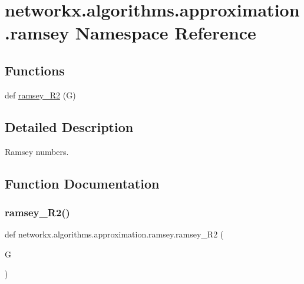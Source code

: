 \hypertarget{namespacenetworkx_1_1algorithms_1_1approximation_1_1ramsey}{}\section{networkx.\+algorithms.\+approximation.\+ramsey Namespace Reference}
\label{namespacenetworkx_1_1algorithms_1_1approximation_1_1ramsey}
\subsection*{Functions}
\begin{DoxyCompactItemize}
\item 
def \hyperlink{namespacenetworkx_1_1algorithms_1_1approximation_1_1ramsey_ab2b9bfb0e6d1b340ce9e30457d7f93b0}{ramsey\+\_\+\+R2} (G)
\end{DoxyCompactItemize}


\subsection{Detailed Description}
\begin{DoxyVerb}Ramsey numbers.
\end{DoxyVerb}
 

\subsection{Function Documentation}
\mbox{\label{namespacenetworkx_1_1algorithms_1_1approximation_1_1ramsey_ab2b9bfb0e6d1b340ce9e30457d7f93b0}} 
\subsubsection{\texorpdfstring{ramsey\+\_\+\+R2()}{ramsey\_R2()}}
{\footnotesize\ttfamily def networkx.\+algorithms.\+approximation.\+ramsey.\+ramsey\+\_\+\+R2 (\begin{DoxyParamCaption}\item[{}]{G }\end{DoxyParamCaption})}

